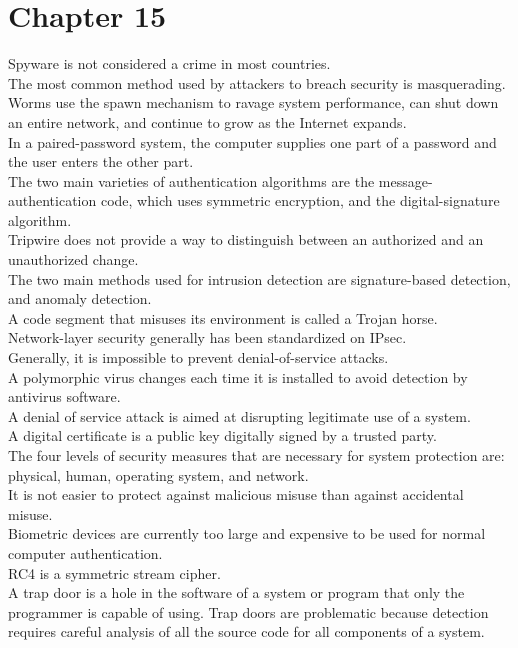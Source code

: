 \documentclass[10pt]{article}
\begin{document}
\section*{\centering Chapter 15}
Spyware is not considered a crime in most countries.\\[2mm]
The most common method used by attackers to breach security is masquerading.\\[2mm]
Worms use the spawn mechanism to ravage system performance, can shut down an entire network, and continue to grow as the Internet expands.\\[2mm]
In a paired-password system, the computer supplies one part of a password and the user enters the other part.\\[2mm]
The two main varieties of authentication algorithms are the message-authentication code, which uses symmetric encryption, and the digital-signature algorithm.\\[2mm]
Tripwire does not provide a way to distinguish between an authorized and an unauthorized change.\\[2mm]
The two main methods used for intrusion detection are signature-based detection, and anomaly detection.\\[2mm]
A code segment that misuses its environment is called a Trojan horse.\\[2mm]
Network-layer security generally has been standardized on IPsec.\\[2mm]
Generally, it is impossible to prevent denial-of-service attacks.\\[2mm]
A polymorphic virus changes each time it is installed to avoid detection by antivirus software.\\[2mm]
A denial of service attack is aimed at disrupting legitimate use of a system.\\[2mm]
A digital certificate is a public key digitally signed by a trusted party.\\[2mm]
The four levels of security measures that are necessary for system protection are: physical, human, operating system, and network.\\[2mm]
It is not easier to protect against malicious misuse than against accidental misuse.\\[2mm]
Biometric devices are currently too large and expensive to be used for normal computer authentication.\\[2mm]
RC4 is a symmetric stream cipher.\\[2mm]
A trap door is a hole in the software of a system or program that only the programmer is capable of using. Trap doors are problematic because detection requires careful analysis of all the source code for all components of a system.\\[2mm]
\end{document}
